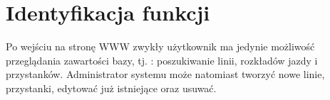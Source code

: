 \section{Identyfikacja funkcji}


Po wejściu na stronę WWW zwykły użytkownik ma jedynie możliwość przeglądania zawartości bazy, tj. : poszukiwanie linii, rozkładów jazdy i przystanków. Administrator systemu może natomiast tworzyć nowe linie, przystanki, edytować już istniejące oraz usuwać. 